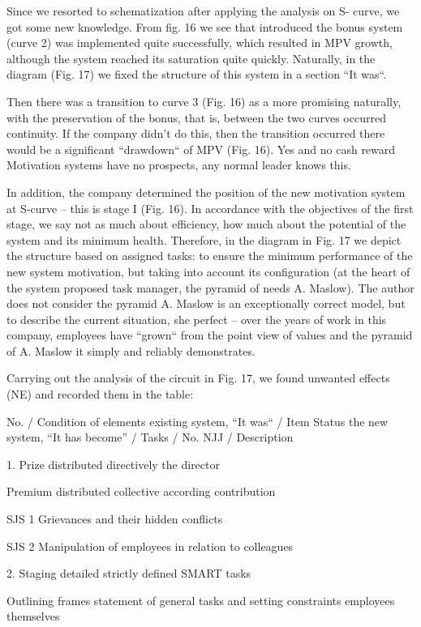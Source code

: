 \documentclass[11pt,a4paper]{book}
\begin{document}
Since we resorted to schematization after applying the analysis on S- curve,
we got some new knowledge. From fig. 16 we see that introduced the bonus
system (curve 2) was implemented quite successfully, which resulted in MPV
growth, although the system reached its saturation quite quickly.  Naturally,
in the diagram (Fig. 17) we fixed the structure of this system in a section
“It was“.

Then there was a transition to curve 3 (Fig. 16) as a more promising
naturally, with the preservation of the bonus, that is, between the two curves
occurred continuity. If the company didn’t do this, then the transition
occurred there would be a significant “drawdown“ of MPV (Fig. 16). Yes and no
cash reward Motivation systems have no prospects, any normal leader knows
this.

In addition, the company determined the position of the new motivation system
at S-curve -- this is stage I (Fig. 16). In accordance with the objectives of
the first stage, we say not as much about efficiency, how much about the
potential of the system and its minimum health. Therefore, in the diagram in
Fig. 17 we depict the structure based on assigned tasks: to ensure the minimum
performance of the new system motivation, but taking into account its
configuration (at the heart of the system proposed task manager, the pyramid
of needs A. Maslow). The author does not consider the pyramid A. Maslow is an
exceptionally correct model, but to describe the current situation, she
perfect -- over the years of work in this company, employees have “grown“ from
the point view of values and the pyramid of A. Maslow it simply and reliably
demonstrates.

Carrying out the analysis of the circuit in Fig. 17, we found unwanted effects
(NE) and recorded them in the table:


No. / Condition of elements existing system, “It was“ / Item Status the new
system, “It has become” / Tasks / No.  NJJ / Description

1.  Prize distributed directively the director

Premium distributed collective according contribution

SJS 1 Grievances and their hidden conflicts

SJS 2 Manipulation of employees in relation to colleagues

2. Staging detailed strictly defined SMART tasks

Outlining frames statement of general tasks and setting constraints employees
themselves
\end{document}
